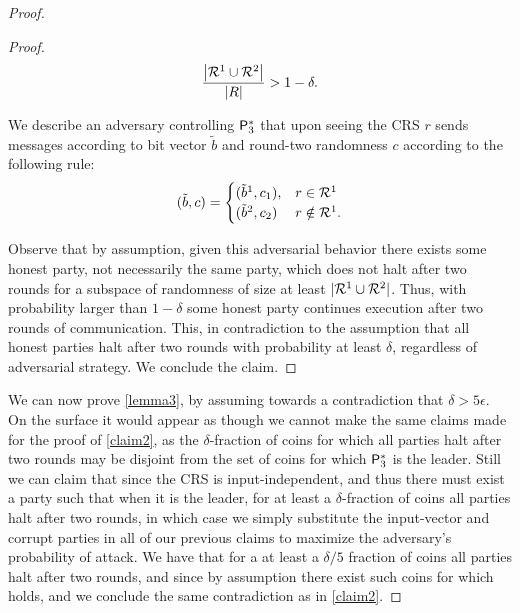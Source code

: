 \begin{proof}
\begin{proof}
		\[
		\frac{\left|\mathcal{R}^1 \cup \mathcal{R}^2\right|}{\left|R\right|} > 1 - \delta.
		\]
		
		We describe an adversary controlling $\mathsf{P}_3^\ast$ that upon seeing the CRS $r$ sends messages according to bit vector $\tilde{b}$ and round-two randomness $c$ according to the following rule:
		\[
		(\tilde{b},c) =   \begin{cases}
		(\tilde{b}^1,c_1), & r \in \mathcal{R}^1 \\
		(\tilde{b}^2,c_2) & r \notin \mathcal{R}^1.
		\end{cases}
		\]
		
		Observe that by assumption, given this adversarial behavior there exists some honest party, not necessarily the same party, which does not halt after two rounds for a subspace of randomness of size at least $|\mathcal{R}^1 \cup \mathcal{R}^2|$. Thus, with probability larger than $1-\delta$ some honest party continues execution after two rounds of communication. This, in contradiction to the assumption that all honest parties halt after two rounds with probability at least $\delta$, regardless of adversarial strategy. We conclude the claim.
		\end{proof}

We can now prove \cref{lemma3}, by assuming towards a contradiction that $\delta > 5\epsilon$. On the surface it would appear as though we cannot make the same claims made for the proof of \cref{claim2}, as the $\delta$-fraction of coins for which all parties halt after two rounds may be disjoint from the set of coins for which $\mathsf{P}_3^\ast$ is the leader. Still we can claim that since the CRS is input-independent, and thus there must exist a party such that when it is the leader, for at least a $\delta$-fraction of coins all parties halt after two rounds, in which case we simply substitute the input-vector and corrupt parties in all of our previous claims to maximize the adversary's probability of attack. We have that for a at least a $\delta/5$ fraction of coins all parties halt after two rounds, and since by assumption there exist such coins for which \agr holds, and we conclude the same contradiction as in \cref{claim2}.
\end{proof}



